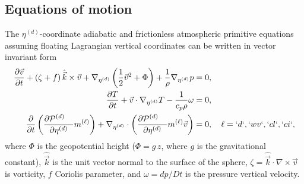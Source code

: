 \documentclass{agujournal}
\begin{document}
{%

%
\subsection{Equations of motion}
The $\eta^{(d)}$-coordinate adiabatic and frictionless atmospheric primitive equations assuming floating Lagrangian vertical coordinates \citep{S1945JAS,L2004MWR} can be written in vector invariant form
\begin{align}
\frac{\partial \vec{v}}{\partial t} + \left( \zeta + f \right) {\hat{\vec{k}}} \times \vec{v}  + \nabla_{\eta^{(d)}} \left( \frac12 \vec{v}^2 + \Phi \right)  + \frac{1}{\rho} \nabla_{\eta^{(d)}} p &= 0,\label{E:PEmom} \\
\frac{\partial T}{\partial t} + \vec{v} \cdot \nabla_{\eta^{(d)}} T  -  \frac{1}{c_p \rho} \omega  &= 0, \label{E:PEtemp} \\
\frac{\partial}{\partial t} \left( \frac{\partial \mathcal{P}^{(d)}\quad }{\partial \eta^{(d)}} m^{(\ell)} \right) +  \nabla_{\eta^{(d)}}\cdot   \left( \frac{\partial \mathcal{P}^{(d)}\quad }{\partial \eta^{(d)}} m^{(\ell)} \vec{v} \right)  &= 0, \quad \ell=`d`,`wv`,`cl`,`ci`, \label{E:PEq}
\end{align}
where $\Phi$ is the geopotential height ($\Phi=g\, z$, where $g$ is the gravitational constant), ${\hat{\vec{k}}}$ is the unit vector normal to the surface of the sphere, $\zeta = {\hat{\vec{k}}} \cdot {\nabla \times} \vec{v}$ is vorticity, $f$ Coriolis parameter, and $\omega = dp/Dt$ is the pressure vertical velocity. 

}
\end{document}
